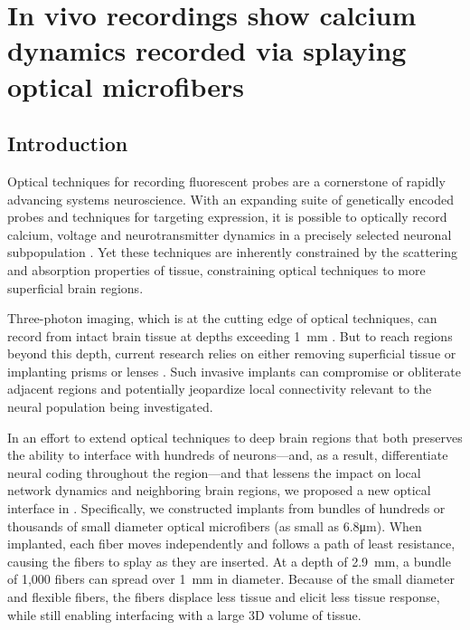 \chapter{In vivo recordings show calcium dynamics recorded via splaying optical microfibers}

\label{chapter:recording}
\thispagestyle{myheadings}

\graphicspath{{5_Recording/Figures/}}

\section{Introduction}

Optical techniques for recording fluorescent probes are a cornerstone 
of rapidly advancing systems neuroscience. With an expanding suite of 
genetically encoded probes and techniques for targeting expression, it
 is possible to optically record calcium, voltage and neurotransmitter
 dynamics in a precisely selected neuronal subpopulation 
\cite{Emiliani:2015jl,Gong:2015is}. Yet these techniques are 
inherently constrained by the scattering and absorption properties of 
tissue, constraining optical techniques to more superficial brain
regions.



Three-photon imaging, which is at the cutting edge of optical techniques,
 can record from intact brain tissue at depths exceeding 
1~\si{\milli\meter} \cite{Horton:2013gxa,Wang:2017jp}. But to reach 
regions beyond this depth, current research relies on either removing 
superficial tissue \cite{Dombeck:2010jr} or implanting prisms or 
lenses \cite{Jung:2004kv,Barretto:2009hk,Andermann:2013kc,Cui:2013dq}.
 Such invasive implants can compromise or obliterate adjacent regions 
and potentially jeopardize local connectivity relevant to the neural 
population being investigated.



In an effort to extend optical techniques to deep brain regions that 
both preserves the ability to interface with hundreds of 
neurons---and, as a result, differentiate neural coding throughout the 
region---and that lessens the impact on local network dynamics and 
neighboring brain regions, we proposed a new optical interface in 
. Specifically, we constructed implants from 
bundles of hundreds or thousands of small diameter optical microfibers
 (as small as 6.8\si{\micro\meter}). When implanted, each fiber moves 
independently and follows a path of least resistance, causing the 
fibers to splay as they are inserted. At a depth of 
2.9~\si{\milli\meter}, a bundle of 1,000 fibers can spread over 
1~\si{\milli\meter} in diameter. Because of the small diameter 
and flexible fibers, the fibers displace less tissue and elicit less 
tissue response, while still enabling interfacing with a large 3D 
volume of tissue.



